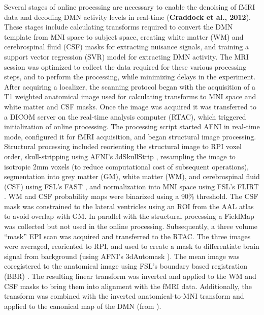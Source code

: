 Several stages of online processing are necessary to enable the denoising of fMRI data and decoding DMN activity levels in real-time (\textbf{Craddock et al., 2012}). These stages include calculating transforms required to convert the DMN template from MNI space to subject space, creating white matter (WM) and cerebrospinal fluid (CSF) masks for extracting nuisance signals, and training a support vector regression (SVR) model for extracting DMN activity. The MRI session was optimized to collect the data required for these various processing steps, and to perform the processing, while minimizing delays in the experiment.
After acquiring a localizer, the scanning protocol began with the acquisition of a T1 weighted anatomical image used for calculating transforms to MNI space and white matter and CSF masks. Once the image was acquired it was transferred to a DICOM server on the real-time analysis computer (RTAC), which triggered initialization of online processing. The processing script started AFNI in real-time mode, configured it for fMRI acquisition, and began structural image processing. Structural processing included reorienting the structural image to RPI voxel order, skull-stripping using AFNI's 3dSkullStrip \cite{Cox_1996}, resampling the image to isotropic 2mm voxels (to reduce computational cost of subsequent operations), segmentation into grey matter (GM), white matter (WM), and cerebrospinal fluid (CSF) using FSL's FAST \cite{Zhang_2001}, and normalization into MNI space using FSL's FLIRT \cite{Jenkinson_2001,Jenkinson_2002}. WM and CSF probability maps were binarized using a 90\% threshold. The CSF mask was constrained to the lateral ventricles using an ROI from the AAL atlas to avoid overlap with GM.
In parallel with the structural processing a FieldMap was collected but not used in the online processing. Subsequently, a three volume ``mask'' EPI scan was acquired and transferred to the RTAC. The three images were averaged, reoriented to RPI, and used to create a mask to differentiate brain signal from background (using AFNI's 3dAutomask \cite{Cox_1996}). The mean image was coregistered to the anatomical image using FSL's boundary based registration (BBR) \cite{Greve_2009}. The resulting linear transform was inverted and applied to the WM and CSF masks to bring them into alignment with the fMRI data. Additionally, the transform was combined with the inverted anatomical-to-MNI transform and applied to the canonical map of the DMN (from \cite{Smith_2009a}).

